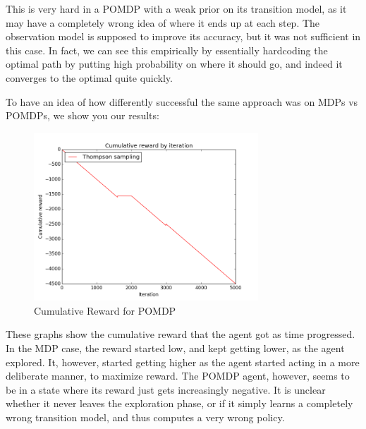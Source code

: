 \documentclass{pset}
\begin{document}
This is very hard in a POMDP with a weak prior on its transition model, as it
may have a completely wrong idea of where it ends up at each step. The
observation model is supposed to improve its accuracy, but it was not sufficient
in this case. In fact, we can see this empirically by essentially hardcoding the
optimal path by putting high probability on where it should go, and indeed it
converges to the optimal quite quickly.

To have an idea of how differently successful the same approach was on MDPs vs
POMDPs, we show you our results:

\begin{figure}[ht]
\centering
\includegraphics[width=0.75\textwidth]{img/pomdp.png}
\caption{\label{fig:pomdp}Cumulative Reward for POMDP}
\end{figure}

These graphs show the cumulative reward that the agent got as time progressed.
In the MDP case, the reward started low, and kept getting lower, as the agent
explored. It, however, started getting higher as the agent started acting in a
more deliberate manner, to maximize reward. The POMDP agent, however, seems to
be in a state where its reward just gets increasingly negative. It is unclear
whether it never leaves the exploration phase, or if it simply learns a completely
wrong transition model, and thus computes a very wrong policy.




\end{document}

